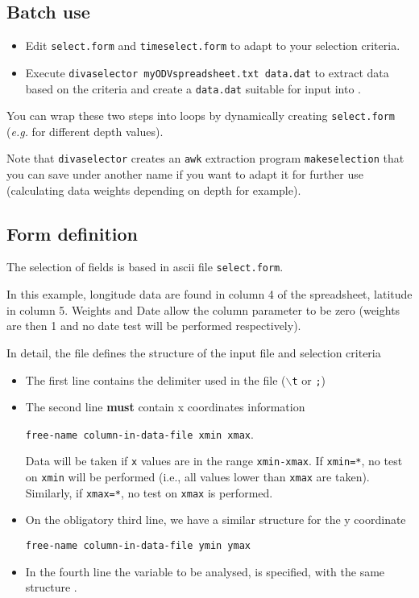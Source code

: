 \subsection{Batch use}

\begin{itemize}
\item Edit {\tt select.form} and {\tt timeselect.form} to adapt to your selection criteria.
\item Execute {\tt divaselector myODVspreadsheet.txt data.dat} to extract data based on the criteria and create a {\tt data.dat} suitable for input into \diva.
\end{itemize}

You can wrap these two steps into loops by dynamically creating {\tt select.form} (\textit{e.g.} for different depth values).

Note that {\tt divaselector} creates an {\tt awk} extraction program {\tt makeselection} that you can save under another name if you want to adapt it for further use (calculating data weights depending on depth for example).




\subsection{Form definition}

The selection of fields is based in ascii file {\tt select.form}. 

In this example, longitude data are found in column 4 of the spreadsheet, latitude in column 5.
Weights and Date allow the column parameter to be zero (weights are then 1 and no date test will be performed respectively).

In detail, the file defines the structure of the input file and selection criteria
\begin{itemize}
\item
The first line contains the delimiter used in the file ($\backslash${\tt t} or {\tt ;})
\item 
The second line {\bf must} contain x coordinates information

{\tt free-name  column-in-data-file  xmin xmax}. 

Data will be taken if \texttt{x} values are in the range \texttt{xmin-xmax}. If \texttt{xmin=*}, no test on \texttt{xmin} will be performed (i.e., all values lower than \texttt{xmax} are taken). Similarly, if \texttt{xmax=*}, no test on \texttt{xmax} is performed.

\item On the obligatory third line, we have a similar structure for the y coordinate
 
{\tt free-name  column-in-data-file  ymin ymax}

\item In the fourth line the variable to be analysed, is specified, with the same structure .

\end{itemize}


